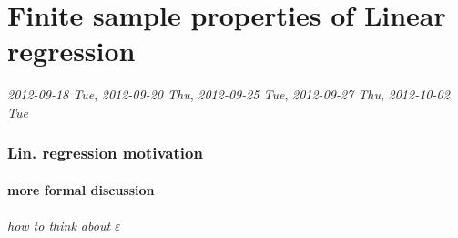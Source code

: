 
\part{Finite sample properties of Linear regression}

   \textit{2012-09-18 Tue}, \textit{2012-09-20 Thu}, \textit{2012-09-25 Tue}, 
   \textit{2012-09-27 Thu}, \textit{2012-10-02 Tue}
\section{Lin. regression motivation}
\label{sec-1}
\subsection{more formal discussion}
\label{sec-1-1}
\paragraph{how to think about $\varepsilon$}
\label{sec-1-1-1}

